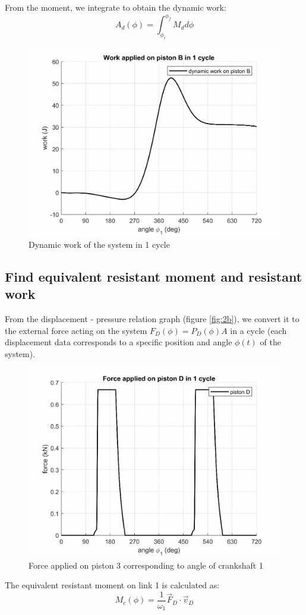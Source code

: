 From the moment, we integrate to obtain the dynamic work:
\begin{equation}
	A_d(\phi)=\int_{\phi_i}^{\phi_f}M_d d\phi
\end{equation}
\begin{figure}[h]
	\centering
	\includegraphics[width=0.6\linewidth]{14}
	\caption{Dynamic work of the system in 1 cycle}
	\label{fig:14}
\end{figure}
\subsection{Find equivalent resistant moment and resistant work}
From the displacement - pressure  relation graph (figure \ref{fig:2b}), we convert it to the external force acting on the system $ F_D(\phi)=P_D(\phi) A $ in a cycle (each displacement data corresponds to a specific position and angle $ \phi(t) $ of the system).
\begin{figure}[h]
	\centering
	\includegraphics[width=0.6\linewidth]{15}
	\caption{Force applied on piston 3 corresponding to angle of crankshaft 1}
	\label{fig:15}
\end{figure}

The equivalent resistant moment on link 1 is calculated as:
\begin{equation}\label{23}
M_c(\phi)=\dfrac{1}{\omega_1}\vec{F}_D\cdot\vec{v}_D
\end{equation}

